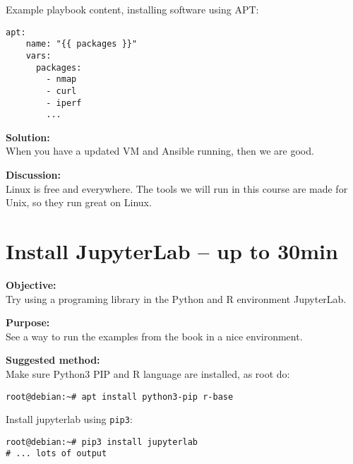 \documentclass[a4paper,11pt,notitlepage]{report}
\begin{document}
Example playbook content, installing software using APT:
\begin{verbatim}
apt:
    name: "{{ packages }}"
    vars:
      packages:
        - nmap
        - curl
        - iperf
        ...
\end{verbatim}

{\bf Solution:}\\
When you have a updated VM and Ansible running, then we are good.

{\bf Discussion:}\\
Linux is free and everywhere. The tools we will run in this course are made for Unix, so they run great on Linux.



\chapter{Install JupyterLab -- up to 30min}
\label{ex-python-Jupyterlab}


{\bf Objective:}\\
Try using a programing library in the Python and R environment JupyterLab.

{\bf Purpose:}\\
See a way to run the examples from the book in a nice environment.

{\bf Suggested method:}\\
Make sure Python3 PIP and R language are installed, as root do:
\begin{verbatim}
root@debian:~# apt install python3-pip r-base
\end{verbatim}

Install jupyterlab using \verb+pip3+:
\begin{verbatim}
root@debian:~# pip3 install jupyterlab
# ... lots of output
\end{verbatim}

\eject
\end{document}
